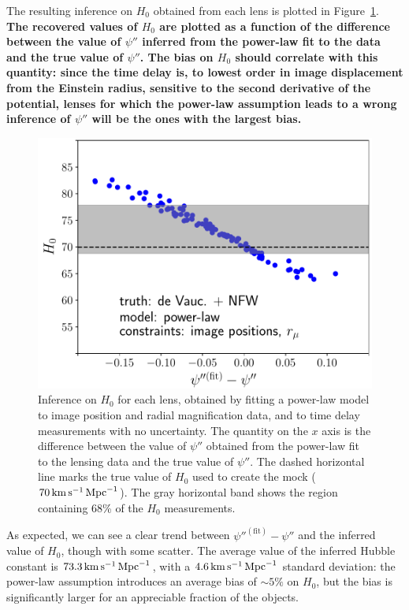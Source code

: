 \documentclass[usenatbib]{mnras}
\def\psiii{\psi''}
\def\Hunit{\,\rm{km}\,{s}^{-1}\,\rm{Mpc}^{-1}}
\def\Fref#1{Figure~\ref{#1}\xspace}
\begin{document}
The resulting inference on $H_0$ obtained from each lens is plotted in \Fref{fig:plH0}.
{\bf 
The recovered values of $H_0$ are plotted as a function of the difference between the value of $\psiii$ inferred from the power-law fit to the data and the true value of $\psiii$.
The bias on $H_0$ should correlate with this quantity: since the time delay is, to lowest order in image displacement from the Einstein radius, sensitive to the second derivative of the potential, lenses for which the power-law assumption leads to a wrong inference of $\psiii$ will be the ones with the largest bias.
}
%
\begin{figure}
 \includegraphics[width=\columnwidth]{individual_H0.pdf}
 \caption{Inference on $H_0$ for each lens, obtained by fitting a power-law model to image position and radial magnification data, and to time delay measurements with no uncertainty.
The quantity on the $x$ axis is the difference between the value of $\psi''$ obtained from the power-law fit to the lensing data and the true value of $\psi''$.
The dashed horizontal line marks the true value of $H_0$ used to create the mock ($70\,\rm{km}\,\rm{s}^{-1}\,\rm{Mpc}^{-1}$).
The gray horizontal band shows the region containing 68\% of the $H_0$ measurements.
}
 \label{fig:plH0}
\end{figure}
%
As expected, we can see a clear trend between $\psi''^{\mathrm{(fit)}} - \psiii$ and the inferred value of $H_0$, though with some scatter.
The average value of the inferred Hubble constant is $73.3\Hunit$, with a $4.6\Hunit$ standard deviation: the power-law assumption introduces an average bias of $\sim5\%$ on $H_0$, but the bias is significantly larger for an appreciable fraction of the objects.
\end{document}
